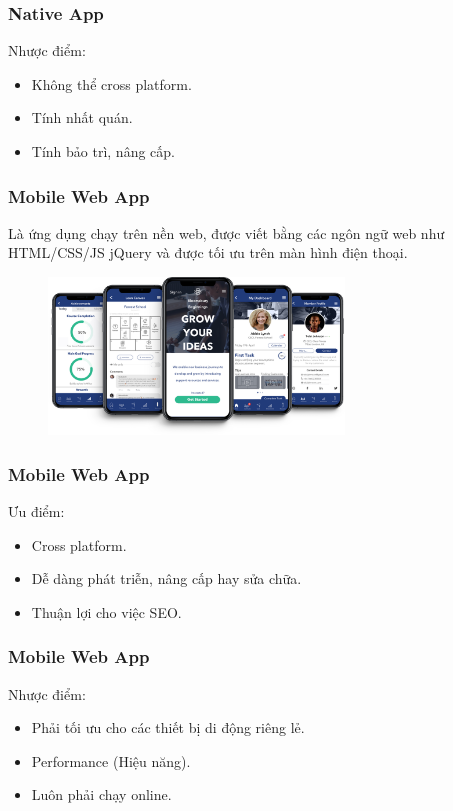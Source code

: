 \documentclass{beamer}
\begin{document}
\begin{frame}
\frametitle{Native App}

Nhược điểm:
\begin{itemize}
	\item<1-> Không thể cross platform.
	\item<2-> Tính nhất quán.
	\item<3-> Tính bảo trì, nâng cấp.
\end{itemize}

\end{frame}

\begin{frame}
\label{MOBILE_WEB_APP}
\frametitle{Mobile Web App}

Là ứng dụng chạy trên nền web, được viết bằng các ngôn ngữ web như HTML/CSS/JS jQuery và được tối ưu trên màn hình điện thoại.

\begin{figure}[h]
	\vspace{5pt}
	\centering
	\includegraphics[width=0.7\textwidth]{mobile-web-app-1}
\end{figure}

\end{frame}


\begin{frame}
\frametitle{Mobile Web App}

Ưu điểm:
\begin{itemize}
    \item<1-> Cross platform.
    \item<2-> Dễ dàng phát triễn, nâng cấp hay sửa chữa.
    \item<3-> Thuận lợi cho việc SEO.
\end{itemize}

\end{frame}

\begin{frame}
\frametitle{Mobile Web App}

Nhược điểm:
\begin{itemize}
	\item<1-> Phải tối ưu cho các thiết bị di động riêng lẻ.
	\item<2-> Performance (Hiệu năng).
	\item<3-> Luôn phải chạy online.
\end{itemize}

\end{frame}
\end{document}
